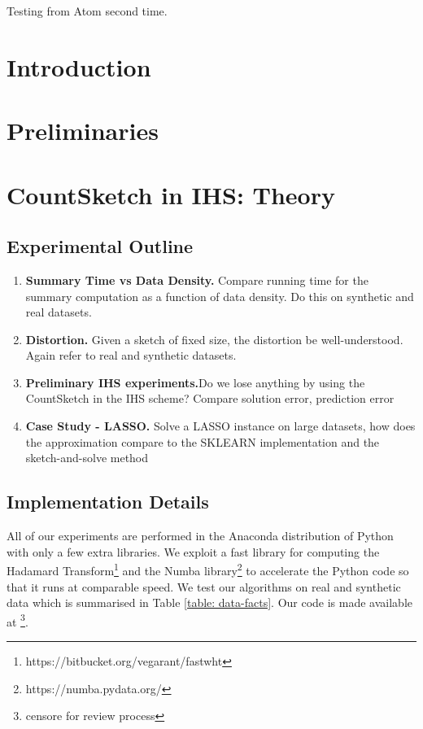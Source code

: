 \documentclass[twoside]{article}
\theoremstyle{definition}\newtheorem{thm}{Theorem}[section]
\theoremstyle{definition}\newtheorem{mydef}[thm]{Definition}
\theoremstyle{definition}\newtheorem{rem}[thm]{Remark}
\theoremstyle{definition}\newtheorem{prop}[thm]{Proposition}
\theoremstyle{definition}\newtheorem{example}[thm]{Example}
\theoremstyle{definition}\newtheorem{claim}[thm]{Claim}
\theoremstyle{definition}\newtheorem{Qu}[thm]{Question}
\theoremstyle{definition}\newtheorem{Lemma}[thm]{Lemma}
\theoremstyle{definition}\newtheorem{Cor}[thm]{Corollary}
\theoremstyle{definition}\newtheorem{Fact}[]{Fact}
\begin{document}
Testing from Atom second time.

\section{Introduction} \label{sec: intro}



\section{Preliminaries} \label{sec: preliminaries}


\section{CountSketch in IHS: Theory} \label{sec: countsketch-properties}
\subsection{Experimental Outline}

\begin{enumerate}
  \item{\textbf{Summary Time vs Data Density.}  Compare running time for the
  summary computation as a function of data density.
  Do this on synthetic and real datasets.}
  \item{\textbf{Distortion.}  Given a sketch of fixed size, the distortion be
  well-understood.  Again refer to real and synthetic datasets.}
  \item{\textbf{Preliminary IHS experiments.}Do we lose anything by using the
  CountSketch in the IHS scheme? Compare solution error, prediction error}
  \item{\textbf{Case Study - LASSO.} Solve a LASSO
  instance on large datasets, how does the approximation compare to the SKLEARN
  implementation and the sketch-and-solve method}
\end{enumerate}




\subsection{Implementation Details}

All of our experiments are performed in the Anaconda distribution of Python
with only a few extra libraries.
We exploit a fast library for computing the Hadamard
Transform\footnote{https://bitbucket.org/vegarant/fastwht} and the Numba
library\footnote{https://numba.pydata.org/} to accelerate the Python code
so that it runs at comparable speed.
We test our algorithms on real and synthetic data which is summarised in Table
\ref{table: data-facts}.
Our code is made available at
\footnote{censore for review process}.
\end{document}
